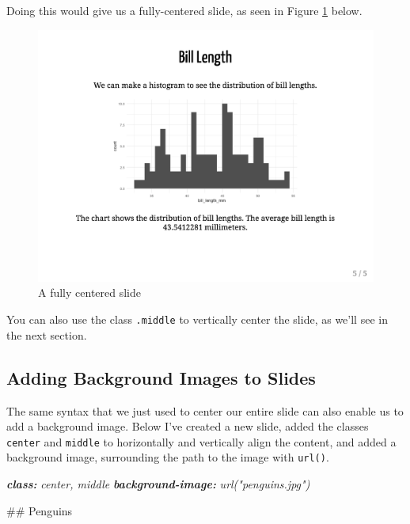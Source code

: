 \documentclass[
]{book}
\newenvironment{Shaded}{\begin{snugshade}}{\end{snugshade}}
\newcommand{\AnnotationTok}[1]{\textcolor[rgb]{0.56,0.35,0.01}{\textbf{\textit{#1}}}}
\newcommand{\CommentTok}[1]{\textcolor[rgb]{0.56,0.35,0.01}{\textit{#1}}}
\newcommand{\FunctionTok}[1]{\textcolor[rgb]{0.00,0.00,0.00}{#1}}
\begin{document}
Doing this would give us a fully-centered slide, as seen in Figure \ref{fig:slide-centered} below.

\begin{figure}
\includegraphics[width=1\linewidth]{assets/slide-centered} \caption{A fully centered slide}\label{fig:slide-centered}
\end{figure}

You can also use the class \texttt{.middle} to vertically center the slide, as we'll see in the next section.

\hypertarget{adding-background-images-to-slides}{%
\subsection*{Adding Background Images to Slides}\label{adding-background-images-to-slides}}

The same syntax that we just used to center our entire slide can also enable us to add a background image. Below I've created a new slide, added the classes \texttt{center} and \texttt{middle} to horizontally and vertically align the content, and added a background image, surrounding the path to the image with \texttt{url()}.

\begin{Shaded}
\begin{Highlighting}[]
\AnnotationTok{class:}\CommentTok{ center, middle}
\AnnotationTok{background{-}image:}\CommentTok{ url("penguins.jpg")}

\FunctionTok{\#\# Penguins}
\end{Highlighting}
\end{Shaded}
\end{document}
